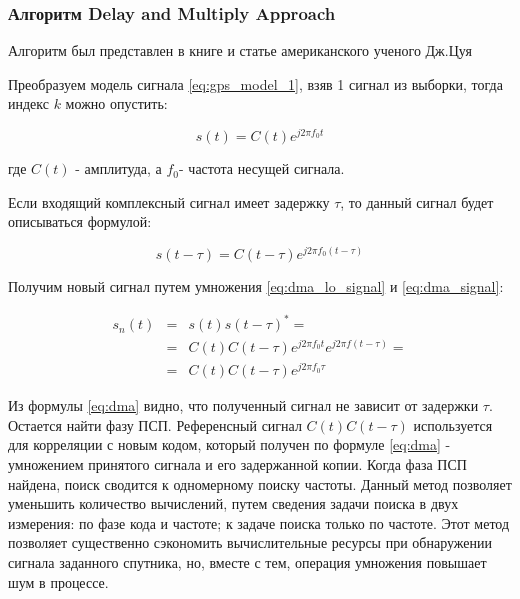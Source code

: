 \subsubsection{Алгоритм Delay and Multiply Approach}
\label{ssec:dma}

Алгоритм был представлен в книге и статье американского ученого Дж.Цуя \cite{lin_dma, tsui}

Преобразуем модель сигнала \ref{eq:gps_model_1}, взяв 1 сигнал из выборки, тогда индекс $k$ можно опустить:
\begin{center}
\begin{equation}
	\label{eq:dma_lo_signal}
	s(t)=C(t)e^{j2{\pi}f_{0}t}
\end{equation}
\end{center}
где $C(t)$ - амплитуда, а $f_{0}$- частота несущей сигнала.

Если входящий комплексный сигнал имеет задержку $\tau$, то данный
сигнал будет описываться формулой: 

\begin{center}
\begin{equation}
	\label{eq:dma_signal}
	s(t-\tau)=C(t-\tau)e^{j2{\pi}f_{0}(t-\tau)}
\end{equation}
\end{center}

Получим новый сигнал путем умножения \ref{eq:dma_lo_signal} и \ref{eq:dma_signal}:
\begin{center}
\begin{eqnarray}
	s_{n}(t) & = & s(t)s(t-\tau)^{*}=\nonumber \\
	 & = & C(t)C(t-\tau)e^{j2\pi f_{0}t}e^{j2\pi f(t-\tau)}=\label{eq:dma}\\
	 & = & C(t)C(t-\tau)e^{j2\pi f_{0}\tau}\nonumber 
\end{eqnarray}

\par\end{center}

Из формулы \ref{eq:dma} видно, что полученный сигнал не зависит от
задержки $\tau$. Остается найти фазу ПСП. Референсный сигнал
$C(t)C(t-\tau)$ используется для корреляции с новым кодом, который
получен по формуле \ref{eq:dma} - умножением принятого сигнала и его задержанной
копии. Когда фаза ПСП найдена, поиск сводится к одномерному поиску
частоты. Данный метод позволяет уменьшить количество вычислений, путем
сведения задачи поиска в двух измерения: по фазе кода и частоте; к
задаче поиска только по частоте. Этот метод позволяет существенно
сэкономить вычислительные ресурсы при обнаружении сигнала заданного
спутника, но, вместе с тем, операция умножения повышает шум в процессе.


